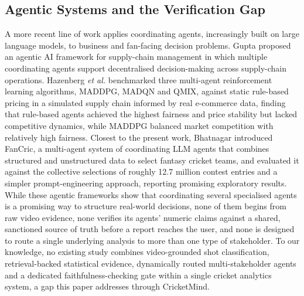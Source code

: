 \subsection{Agentic Systems and the Verification Gap}
\label{subsec:verificationgap}
A more recent line of work applies coordinating agents, increasingly built on large language models, to business and fan-facing decision problems. Gupta \cite{ref6} proposed an agentic AI framework for supply-chain management in which multiple coordinating agents support decentralised decision-making across supply-chain operations.
Hazenberg \textit{et al.} \cite{ref7} benchmarked three multi-agent reinforcement learning algorithms, MADDPG, MADQN and QMIX, against static rule-based pricing in a simulated supply chain informed by real e-commerce data, finding that rule-based agents achieved the highest fairness and price stability but lacked competitive dynamics, while MADDPG balanced market competition with relatively high fairness. Closest to the present work, Bhatnagar \cite{ref8} introduced FanCric, a multi-agent system of coordinating LLM agents that combines structured and unstructured data to select fantasy cricket teams, and evaluated it against the collective selections of roughly 12.7 million contest entries and a simpler prompt-engineering approach, reporting promising exploratory results. While these agentic frameworks show that coordinating several specialised agents is a promising way to structure real-world decisions, none of them begins from raw video evidence, none verifies its agents' numeric claims against a shared, sanctioned source of truth before a report reaches the user, and none is designed to route a single underlying analysis to more than one type of stakeholder. To our knowledge, no existing study combines video-grounded shot classification, retrieval-backed statistical evidence, dynamically routed multi-stakeholder agents and a dedicated faithfulness-checking gate within a single cricket analytics system, a gap this paper addresses through CricketMind.
